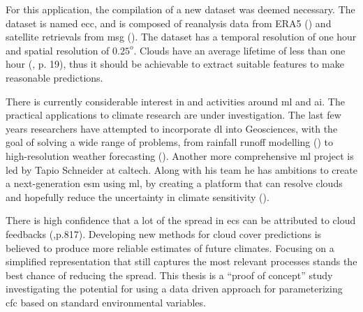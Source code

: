 For this application, the compilation of a new dataset was deemed necessary. The dataset is named \acrfull{ecc}, and is composed of reanalysis data from ERA5 (\cite{Hersbach2018OperationalStatus}) and satellite retrievals from \acrfull{msg} (\cite{Schmetz_meteosat_intro}).
The dataset has a temporal resolution of one hour and spatial resolution of $0.25^o$. Clouds have an average lifetime of less than one hour (\cite{lohmann2016}, p. 19), thus it should be achievable to extract suitable features to make reasonable predictions. 

There is currently considerable interest in and activities around \acrfull{ml} and \acrshort{ai}. The practical applications to climate research are under investigation. The last few years researchers have attempted to incorporate \acrshort{dl} into Geosciences, with the goal of solving a wide range of problems, from rainfall runoff modelling (\cite{hess-23-5089-2019}) to  high-resolution weather forecasting (\cite{Rodrigues2018DeepDownscale:Forecast}). Another more comprehensive \acrshort{ml} project is led by Tapio Schneider at \acrfull{caltech}. Along with his team he has ambitions to create a next-generation \acrfull{esm} using \acrshort{ml}, by creating a platform that can resolve clouds and hopefully reduce the uncertainty in climate sensitivity (\cite{Voosen2018ScienceIntelligence}).

There is high confidence that a lot of the spread in \acrshort{ecs} can be attributed to cloud feedbacks (\cite{IPCC_CH9_climate_models},p.817). Developing new methods for cloud cover predictions is believed to produce more reliable estimates of future climates. Focusing on a simplified representation that still captures the most relevant processes stands the best chance of reducing the spread. This thesis is a ``proof of concept'' study investigating the potential for using a data driven approach for parameterizing \acrfull{cfc} based on standard environmental variables. 


